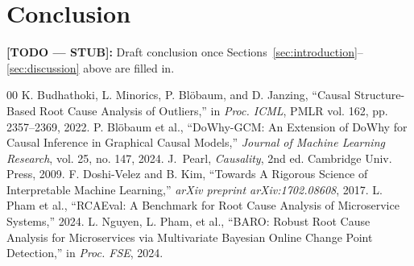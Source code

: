 \documentclass[journal, 10pt]{IEEEtran}
\begin{document}
\section{Conclusion}
\textbf{[TODO --- STUB]:} Draft conclusion once Sections~\ref{sec:introduction}--\ref{sec:discussion} above are filled in.


\begin{thebibliography}{00}
K. Budhathoki, L. Minorics, P. Blöbaum, and D. Janzing, ``Causal Structure-Based Root Cause Analysis of Outliers,'' in \emph{Proc. ICML}, PMLR vol. 162, pp. 2357--2369, 2022.
P. Blöbaum et al., ``DoWhy-GCM: An Extension of DoWhy for Causal Inference in Graphical Causal Models,'' \emph{Journal of Machine Learning Research}, vol. 25, no. 147, 2024.
J.~Pearl, \emph{Causality}, 2nd ed. Cambridge Univ. Press, 2009.
F. Doshi-Velez and B. Kim, ``Towards A Rigorous Science of Interpretable Machine Learning,'' \emph{arXiv preprint arXiv:1702.08608}, 2017.
L. Pham et al., ``RCAEval: A Benchmark for Root Cause Analysis of Microservice Systems,'' 2024.
L. Nguyen, L. Pham, et al., ``BARO: Robust Root Cause Analysis for Microservices via Multivariate Bayesian Online Change Point Detection,'' in \emph{Proc. FSE}, 2024.
\end{thebibliography}
\end{document}
